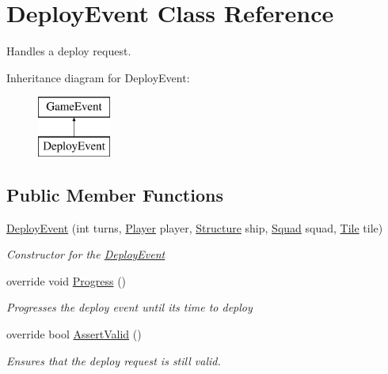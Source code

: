 \hypertarget{class_deploy_event}{}\section{Deploy\+Event Class Reference}
\label{class_deploy_event}


Handles a deploy request.  


Inheritance diagram for Deploy\+Event\+:\begin{figure}[H]
\begin{center}
\leavevmode
\includegraphics[height=2.000000cm]{class_deploy_event}
\end{center}
\end{figure}
\subsection*{Public Member Functions}
\begin{DoxyCompactItemize}
\item 
\hyperlink{class_deploy_event_aa14c6ec588401ae1641461f32a19bc56}{Deploy\+Event} (int turns, \hyperlink{class_player}{Player} player, \hyperlink{class_structure}{Structure} ship, \hyperlink{class_squad}{Squad} squad, \hyperlink{class_tile}{Tile} tile)
\begin{DoxyCompactList}\small\item\em Constructor for the \hyperlink{class_deploy_event}{Deploy\+Event} \end{DoxyCompactList}\item 
override void \hyperlink{class_deploy_event_a65f83dee4eaa234ff7e753792a5fc4f9}{Progress} ()
\begin{DoxyCompactList}\small\item\em Progresses the deploy event until its time to deploy \end{DoxyCompactList}\item 
override bool \hyperlink{class_deploy_event_a9e4512636f367c42fb0c17639af7cd1a}{Assert\+Valid} ()
\begin{DoxyCompactList}\small\item\em Ensures that the deploy request is still valid. \end{DoxyCompactList}\end{DoxyCompactItemize}
